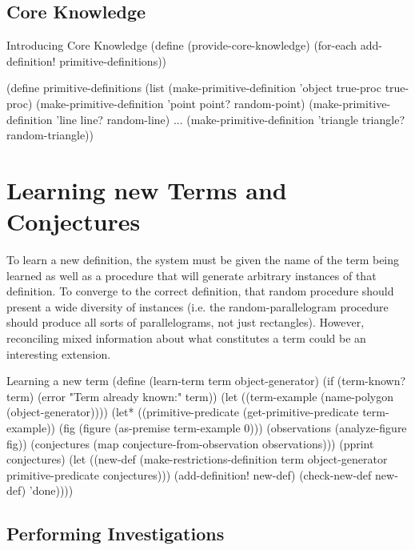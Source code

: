 \subsection{Core Knowledge}

\begin{code-listing}
[label=core-knowledge]
{Introducing Core Knowledge}
(define (provide-core-knowledge)
  (for-each add-definition! primitive-definitions))

(define primitive-definitions
  (list
   (make-primitive-definition 'object true-proc true-proc)
   (make-primitive-definition 'point point? random-point)
   (make-primitive-definition 'line line? random-line)
   ...
   (make-primitive-definition 'triangle triangle? random-triangle))
\end{code-listing}

\section{Learning new Terms and Conjectures}

To learn a new definition, the system must be given the name of the
term being learned as well as a procedure that will generate arbitrary
instances of that definition. To converge to the correct definition,
that random procedure should present a wide diversity of instances
(i.e. the random-parallelogram procedure should produce all sorts of
parallelograms, not just rectangles). However, reconciling mixed
information about what constitutes a term could be an interesting
extension.

\begin{code-listing}{Learning a new term}
(define (learn-term term object-generator)
  (if (term-known? term) (error "Term already known:" term))
  (let ((term-example (name-polygon (object-generator))))
    (let* ((primitive-predicate (get-primitive-predicate term-example))
           (fig (figure (as-premise term-example 0)))
           (observations (analyze-figure fig))
           (conjectures (map conjecture-from-observation observations)))
      (pprint conjectures)
      (let ((new-def
             (make-restrictions-definition term object-generator
                primitive-predicate conjectures)))
        (add-definition! new-def)
        (check-new-def new-def)
        'done))))
\end{code-listing}

\subsection{Performing Investigations}


